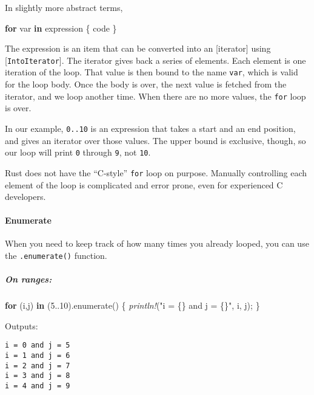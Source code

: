 \documentclass[a4paper,]{book}
\newenvironment{Shaded}{\begin{snugshade}}{\end{snugshade}}
\newcommand{\KeywordTok}[1]{\textcolor[rgb]{0.13,0.29,0.53}{\textbf{{#1}}}}
\newcommand{\DecValTok}[1]{\textcolor[rgb]{0.00,0.00,0.81}{{#1}}}
\newcommand{\StringTok}[1]{\textcolor[rgb]{0.31,0.60,0.02}{{#1}}}
\newcommand{\PreprocessorTok}[1]{\textcolor[rgb]{0.56,0.35,0.01}{\textit{{#1}}}}
\newcommand{\NormalTok}[1]{{#1}}
\let\oldparagraph\paragraph
\renewcommand{\paragraph}[1]{\oldparagraph{#1}\mbox{}}
\let\oldsubparagraph\subparagraph
\renewcommand{\subparagraph}[1]{\oldsubparagraph{#1}\mbox{}}
\begin{document}
In slightly more abstract terms,

\begin{Shaded}
\begin{Highlighting}[]
\KeywordTok{for} \NormalTok{var }\KeywordTok{in} \NormalTok{expression \{}
    \NormalTok{code}
\NormalTok{\}}
\end{Highlighting}
\end{Shaded}

The expression is an item that can be converted into an {[}iterator{]}
using {[}\texttt{IntoIterator}{]}. The iterator gives back a series of
elements. Each element is one iteration of the loop. That value is then
bound to the name \texttt{var}, which is valid for the loop body. Once
the body is over, the next value is fetched from the iterator, and we
loop another time. When there are no more values, the \texttt{for} loop
is over.

In our example, \texttt{0..10} is an expression that takes a start and
an end position, and gives an iterator over those values. The upper
bound is exclusive, though, so our loop will print \texttt{0} through
\texttt{9}, not \texttt{10}.

Rust does not have the ``C-style'' \texttt{for} loop on purpose.
Manually controlling each element of the loop is complicated and error
prone, even for experienced C developers.

\paragraph{Enumerate}\label{enumerate}

When you need to keep track of how many times you already looped, you
can use the \texttt{.enumerate()} function.

\subparagraph{On ranges:}\label{on-ranges}

\begin{Shaded}
\begin{Highlighting}[]
\KeywordTok{for} \NormalTok{(i,j) }\KeywordTok{in} \NormalTok{(}\DecValTok{5.}\NormalTok{.}\DecValTok{10}\NormalTok{).enumerate() \{}
    \PreprocessorTok{println!}\NormalTok{(}\StringTok{"i = \{\} and j = \{\}"}\NormalTok{, i, j);}
\NormalTok{\}}
\end{Highlighting}
\end{Shaded}

Outputs:

\begin{verbatim}
i = 0 and j = 5
i = 1 and j = 6
i = 2 and j = 7
i = 3 and j = 8
i = 4 and j = 9
\end{verbatim}
\end{document}
